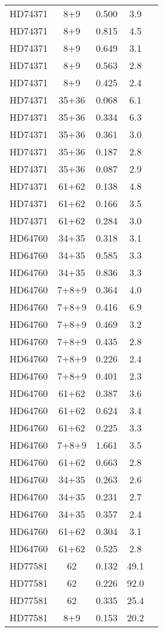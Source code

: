 \begin{table*}
\begin{tabular}{l c c c c}
HD74371 & 8+9 & 0.500 & 3.9\\ 
HD74371 & 8+9 & 0.815 & 4.5\\ 
HD74371 & 8+9 & 0.649 & 3.1\\ 
HD74371 & 8+9 & 0.563 & 2.8\\ 
HD74371 & 8+9 & 0.425 & 2.4\\ 
HD74371 & 35+36 & 0.068 & 6.1\\ 
HD74371 & 35+36 & 0.334 & 6.3\\ 
HD74371 & 35+36 & 0.361 & 3.0\\ 
HD74371 & 35+36 & 0.187 & 2.8\\ 
HD74371 & 35+36 & 0.087 & 2.9\\ 
HD74371 & 61+62 & 0.138 & 4.8\\ 
HD74371 & 61+62 & 0.166 & 3.5\\ 
HD74371 & 61+62 & 0.284 & 3.0\\ 
\hline
HD64760 & 34+35 & 0.318 & 3.1\\ 
HD64760 & 34+35 & 0.585 & 3.3\\ 
HD64760 & 34+35 & 0.836 & 3.3\\ 
HD64760 & 7+8+9 & 0.364 & 4.0\\ 
HD64760 & 7+8+9 & 0.416 & 6.9\\ 
HD64760 & 7+8+9 & 0.469 & 3.2\\ 
HD64760 & 7+8+9 & 0.435 & 2.8\\ 
HD64760 & 7+8+9 & 0.226 & 2.4\\ 
HD64760 & 7+8+9 & 0.401 & 2.3\\ 
HD64760 & 61+62 & 0.387 & 3.6\\ 
HD64760 & 61+62 & 0.624 & 3.4\\ 
HD64760 & 61+62 & 0.225 & 3.3\\ 
HD64760 & 7+8+9 & 1.661 & 3.5\\ 
HD64760 & 61+62 & 0.663 & 2.8\\ 
HD64760 & 34+35 & 0.263 & 2.6\\ 
HD64760 & 34+35 & 0.231 & 2.7\\ 
HD64760 & 34+35 & 0.357 & 2.4\\ 
HD64760 & 61+62 & 0.304 & 3.1\\ 
HD64760 & 61+62 & 0.525 & 2.8\\ 
\hline
HD77581 & 62 & 0.132 & 49.1\\ 
HD77581 & 62 & 0.226 & 92.0\\ 
HD77581 & 62 & 0.335 & 25.4\\ 
HD77581 & 8+9 & 0.153 & 20.2\\ 

\end{tabular}
\end{table*}
